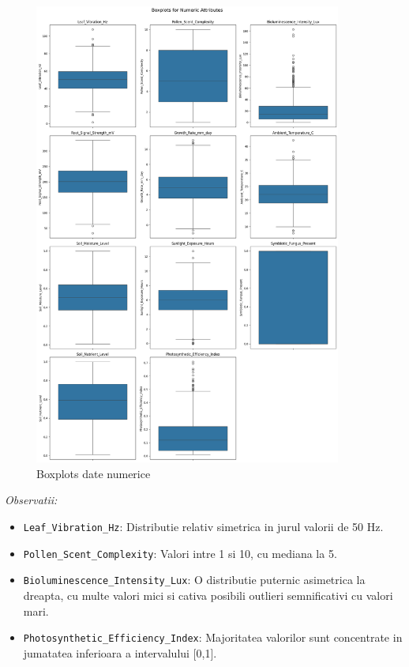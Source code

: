 \documentclass[11pt, a4paper]{article}
\begin{document}
\begin{figure}[H]
    \centering
    \includegraphics[width=0.9\textwidth]{numeric_boxplots.png}
    \caption{Boxplots date numerice}
    \label{fig:boxplots_numeric}
\end{figure}

\textit{Observatii:}
\begin{itemize}[noitemsep, topsep=1pt]
    \item \texttt{Leaf\_Vibration\_Hz}: Distributie relativ simetrica in jurul valorii de 50 Hz.
    \item \texttt{Pollen\_Scent\_Complexity}: Valori intre 1 si 10, cu mediana la 5.
    \item \texttt{Bioluminescence\_Intensity\_Lux}: O distributie puternic asimetrica la dreapta, cu multe valori mici si cativa posibili outlieri semnificativi cu valori mari.
    \item \texttt{Photosynthetic\_Efficiency\_Index}: Majoritatea valorilor sunt concentrate in jumatatea inferioara a intervalului [0,1].
\end{itemize}
\end{document}
